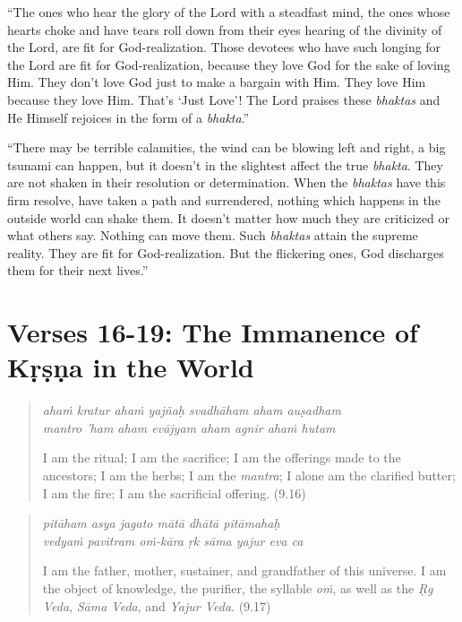 \documentclass[12pt, twoside, openright]{memoir}
\begin{document}
\enquote{The ones who hear the glory of the Lord with a steadfast mind, the ones whose hearts choke and have tears roll down from their eyes hearing of the divinity of the Lord, are fit for God-realization. Those devotees who have such longing for the Lord are fit for God-realization, because they love God for the sake of loving Him. They don’t love God just to make a bargain with Him. They love Him because they love Him. That’s \enquote{Just Love}! The Lord praises these \textit{bhaktas} and He Himself rejoices in the form of a \textit{bhakta}.}

\enquote{There may be terrible calamities, the wind can be blowing left and right, a big tsunami can happen, but it doesn’t in the slightest affect the true \textit{bhakta}. They are not shaken in their resolution or determination. When the \textit{bhaktas} have this firm resolve, have taken a path and surrendered, nothing which happens in the outside world can shake them. It doesn’t matter how much they are criticized or what others say. Nothing can move them. Such \textit{bhaktas} attain the supreme reality. They are fit for God-realization. But the flickering ones, God discharges them for their next lives.}

\section{Verses 16-19: The Immanence of Kṛṣṇa in the World}\label{sec-verses-16-19-the-immanence-of-krsna-in-the-world}


\par
\begin{verse}
\textit{ahaṁ kratur ahaṁ yajñaḥ svadhāham aham auṣadham} \\
\textit{mantro ’ham aham evājyam aham agnir ahaṁ hutam}

\noindent I am the ritual; I am the sacrifice; I am the offerings made to the ancestors; I am the herbs; I am the \textit{mantra}; I alone am the clarified butter; I am the fire; I am the sacrificial offering. (9.16)
\end{verse}
\par



\par
\begin{verse}
\textit{pitāham asya jagato mātā dhātā pitāmahaḥ} \\
\textit{vedyaṁ pavitram oṁ-kāra ṛk sāma yajur eva ca}

\noindent I am the father, mother, sustainer, and grandfather of this universe. I am the object of knowledge, the purifier, the syllable \textit{oṁ}, as well as the \textit{Ṛg Veda}, \textit{Sāma Veda}, and \textit{Yajur Veda}. (9.17)
\end{verse}
\par
\end{document}
